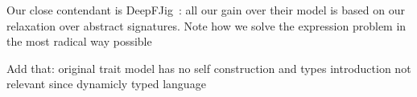 Our close contendant is DeepFJig~\cite{corradi2011deepfjig}: all our gain over their model is based on our relaxation over abstract signatures.
Note how we solve the expression problem in the most radical way possible 

Add that: original trait model has no self construction and types introduction not relevant since dynamicly typed language

